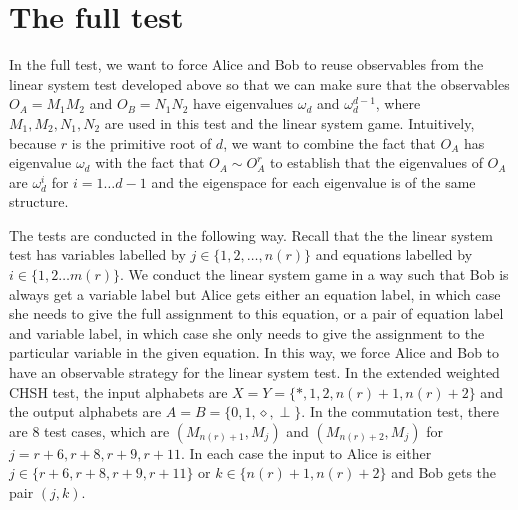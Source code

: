 \documentclass[11pt,letterpaper]{article}
\newcommand{\1}{\mathbb{1}}
\newcommand{\nr}{n(r)}
\newcommand{\mr}{m(r)}
\theoremstyle{definition}
\begin{document}
\section{The full test}
\label{sec:main}
In the full test,
we want to force Alice and Bob to reuse observables 
from the linear system test developed above so that we can make sure that the observables 
$O_A = M_1M_2$ and $O_B =N_1N_2$ have eigenvalues $\omega_d$ and $\omega_d^{d-1}$,
where $M_1,M_2,N_1,N_2$ are used in this test and the linear system game.
Intuitively, because $r$ is the primitive root of $d$, 
we want to combine the fact that $O_A$ has eigenvalue $\omega_d$ with the fact that 
$O_A \sim O_A^r$ to establish that
the eigenvalues of $O_A$ are $\omega_d^i$ for $i =1 \dots d-1$ and the eigenspace for 
each eigenvalue is of the same structure.

The tests are conducted in the following way.
Recall that the the linear system test has variables labelled by $j \in \{1,2,\dots,\nr\}$ and
equations labelled by $i \in \{1, 2 \dots \mr\}$. 
We conduct the linear system game in a way such that Bob is always get a variable label
but Alice gets either an equation label, in which case she needs to give the full assignment to this equation,
or a pair of equation label and variable label, in which case she only needs to give the assignment to the particular 
variable in the given equation. In this way, we force Alice and Bob to have an observable strategy for the linear system 
test.
In the extended weighted CHSH test, 
the input alphabets are $X = Y = \{\ast, 1, 2, \nr+1,\nr+2\}$ and the
output alphabets are $A = B = \{0, 1, \diamond, \perp\}$.
In the commutation test, there are $8$ test cases, which are
$(M_{\nr+1}, M_j)$ and $(M_{\nr+2}, M_j)$ for $j = r+6, r+8, r+9, r+11$.
In each case the input to Alice is either $j \in \{r+6, r+8,r+9, r+11\}$ or $k \in \{\nr+1, \nr+2\}$
and Bob gets the pair $(j,k)$.
\end{document}
